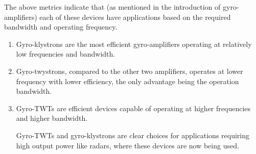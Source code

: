 \begin{table}[H]
	\caption{Relativistic Short-Pulse Gyro-Twystrons\cite{ref:soa} }
	\label{tab:spgt}
\end{table}

\begin{table}[H]
	\caption{Relativistic Short-Pulse Gyro-TWTs\cite{ref:soa} }
	\label{tab:spgtw}
\end{table}

The above metrics\cite{ref:soa} indicate that (as mentioned in the introduction of gyro-amplifiers) each of these devices have applications based on the required bandwidth and operating frequency.
\begin{enumerate}
\item Gyro-klystrons are the most efficient gyro-amplifiers operating at relatively low frequencies and bandwidth.
\item Gyro-twystrons, compared to the other two amplifiers, operates at lower frequency with lower efficiency, the only advantage being the operation bandwidth.
\item Gyro-TWTs are efficient devices capable of operating at higher frequencies and higher bandwidth.

Gyro-TWTs and gyro-klystrons are clear choices for applications requiring high output power like radars, where these devices are now being used.

\end{enumerate}
